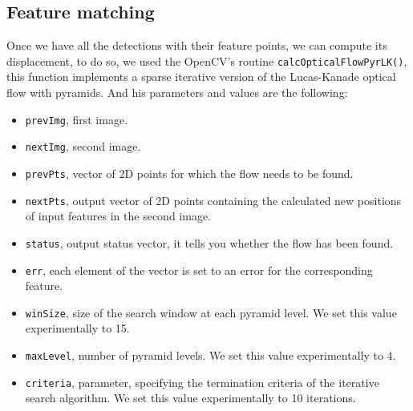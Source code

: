  

\subsection{Feature matching}


Once we have all the detections with their feature points, we can compute its displacement, to do so,  we used the OpenCV's routine \texttt{calcOpticalFlowPyrLK()}, this function implements a sparse iterative version of the Lucas-Kanade optical flow with pyramids. And his parameters and values are the following:
 
\begin{itemize}

\item \texttt{prevImg}, first image.
\item \texttt{nextImg}, second image.
\item \texttt{prevPts}, vector of 2D points for which the flow needs to be found. 
\item \texttt{nextPts}, output vector of 2D points containing the calculated new positions of input features in the second image. 
\item \texttt{status}, output status vector, it tells you whether the flow has been found.  
\item \texttt{err}, each element of the vector is set to an error for the corresponding feature.
\item \texttt{winSize}, size of the search window at each pyramid level. We set this value experimentally to 15.
\item \texttt{maxLevel}, number of pyramid levels. We set this value experimentally to 4. 
\item \texttt{criteria}, parameter, specifying the termination criteria of the iterative search algorithm. We set this value experimentally to 10 iterations.
\end{itemize}



